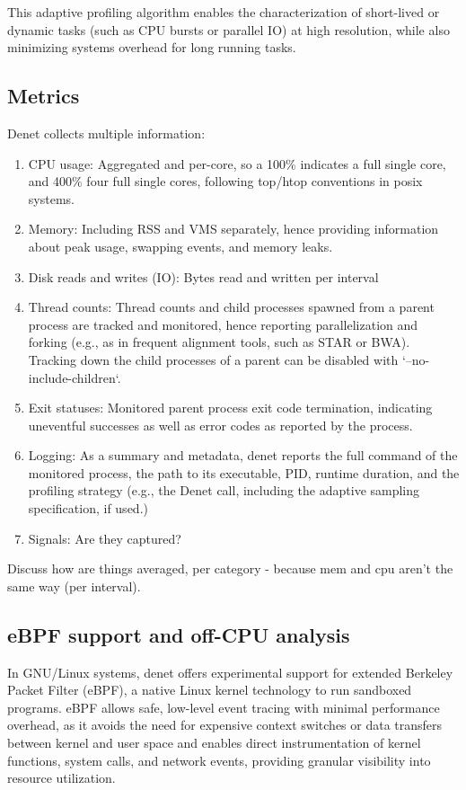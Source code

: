 \documentclass[10pt]{article}
\begin{document}
This adaptive profiling algorithm enables the characterization of short-lived or dynamic tasks (such as CPU bursts or parallel IO) at high resolution, while also minimizing systems overhead for long running tasks.

\subsection*{Metrics}

Denet collects multiple information:

\begin{enumerate}
    \item CPU usage: Aggregated and per-core, so a 100\% indicates a full single core, and 400\% four full single cores, following top/htop conventions in posix systems.
    \item Memory: Including RSS and VMS separately, hence providing information about peak usage, swapping events, and memory leaks.
    \item Disk reads and writes (IO): Bytes read and written per interval
    \item Thread counts: Thread counts and child processes spawned from a parent process are tracked and monitored, hence reporting parallelization and forking (e.g., as in frequent alignment tools, such as STAR or BWA). Tracking down the child processes of a parent can be disabled with `--no-include-children`. 
    \item Exit statuses: Monitored parent process exit code termination, indicating uneventful successes as well as error codes as reported by the process.
    \item Logging: As a summary and metadata, denet reports the full command of the monitored process, the path to its executable, PID, runtime duration, and the profiling strategy (e.g., the Denet call, including the adaptive sampling specification, if used.)
    \item Signals: {\color{red}Are they captured?}
\end{enumerate}

{\color{red}Discuss how are things averaged, per category - because mem and cpu aren’t the same way (per interval).}

\subsection*{eBPF support and off-CPU analysis}

In GNU/Linux systems, denet offers experimental support for extended Berkeley Packet Filter (eBPF), a native Linux kernel technology to run sandboxed programs. eBPF allows safe, low-level event tracing with minimal performance overhead, as it avoids the need for expensive context switches or data transfers between kernel and user space and enables direct instrumentation of kernel functions, system calls, and network events, providing granular visibility into resource utilization. 
\end{document}
